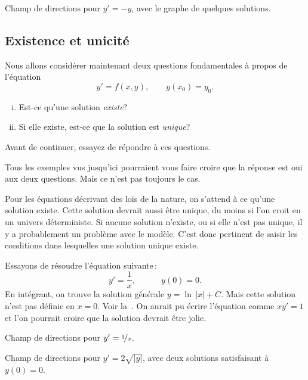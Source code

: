 \begin{myfig}
\capstart
{}
\caption{Champ de directions pour $y' = -y$, avec le graphe de quelques solutions.\label{1.3:fig3}}
\end{myfig}

\subsection{Existence et unicité}

Nous allons considérer maintenant deux questions fondamentales à propos de l'équation
\begin{equation*}
y' = f(x,y), \qquad y(x_0) = y_0.
\end{equation*}
\begin{enumerate}[(i)]
\item Est-ce qu'une solution \emph{existe}?
\item Si elle existe, est-ce que la solution est \emph{unique}?
\end{enumerate}
Avant de continuer, essayez de répondre à ces questions.  

Tous les exemples vus jusqu'ici pourraient vous faire croire que la réponse est \og{}oui\fg{} aux deux questions.  Mais ce n'est pas toujours le cas.

Pour les équations décrivant des lois de la nature, on s'attend à ce qu'une solution existe.  Cette solution devrait aussi être unique, du moins si l'on croit en un univers déterministe.  Si aucune solution n'existe, ou si elle n'est pas unique, il y a probablement un problème avec le modèle.  C'est donc pertinent de saisir les conditions dans lesquelles une solution unique existe.


\begin{example}
Essayons de résoudre l'équation suivante\,: 
\begin{equation*}
	y' = \frac{1}{x}, \quad\qquad  y(0) = 0 .
\end{equation*}
En intégrant, on trouve la solution générale $y = \ln \, \lvert x \rvert + C$.  Mais cette solution n'est pas définie en $x=0$.  Voir la~.  On aurait pu écrire l'équation comme $x y' = 1$ et l'on pourrait croire que la solution \og{}devrait être jolie\fg{}.

\begin{myfig}
\parbox[t]{3in}{
 \capstart
 \caption{Champ de directions pour $y' = \nicefrac{1}{x}$.\label{1.3:xinvfig}}
}
\quad
\parbox[t]{3in}{
 \capstart
 \caption{Champ de directions pour $y' = 2 \sqrt{\lvert y \rvert}$,  avec deux solutions satisfaisant à $y(0) = 0$.\label{1.3:sqrtfig}}
}
\end{myfig}
\end{example}

